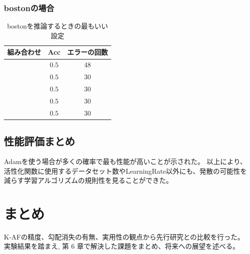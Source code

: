 \subsubsection{bostonの場合}

\begin{table}[htbp]
    \begin{center}
        \caption{bostonを推論するときの最もいい設定}
        \label{bostonbest}
        \vspace{2mm} 
        \begin{tabular}{ |c|c|c| }
        組み合わせ & Acc & エラーの回数 \\
        \hline
        [Adam....    ]       & $ 0.5 $    & 48 \\
        [Adam....    ]          & $ 0.5 $    & 30 \\
        [Adam....    ]            & $ 0.5 $    & 30 \\
        [Adam....    ]          & $ 0.5 $    & 30  \\
        [Adam....    ]       & $ 0.5 $    & 30 \\
        \end{tabular}
    \end{center}
\end{table}




\subsection{性能評価まとめ}
Adamを使う場合が多くの確率で最も性能が高いことが示された。
以上により、活性化関数に使用するデータセット数やLearningRate以外にも、発散の可能性を減らす学習アルゴリズムの規則性を見ることができた。



\section{まとめ}

K-AFの精度、勾配消失の有無、実用性の観点から先行研究との比較を行った。
実験結果を踏まえ, 第 6 章で解決した課題をまとめ、将来への展望を述べる。


